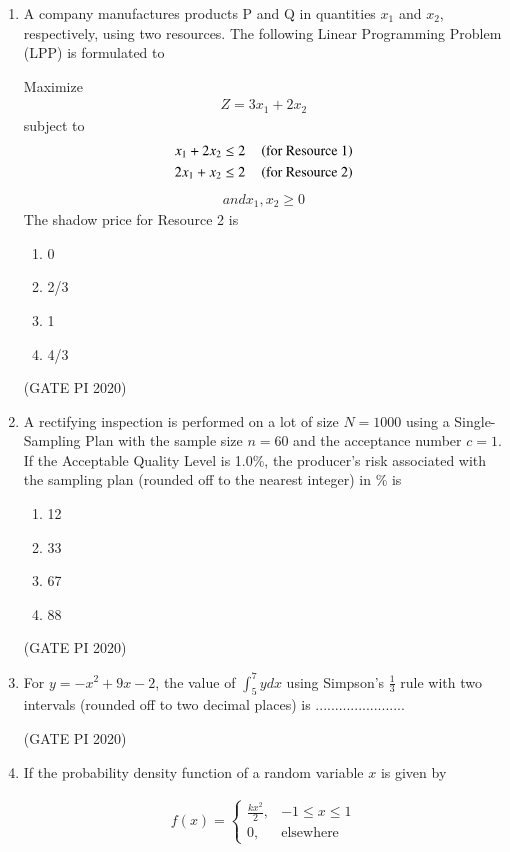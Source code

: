 \documentclass[journal,12pt,onecolumn]{IEEEtran}
\theoremstyle{remark}
\begin{document}
\begin{enumerate}
\item A company manufactures products P and Q in quantities $x_1$ and $x_2$, respectively, using two resources. The following Linear Programming Problem (LPP) is formulated to


Maximize 
\begin{align*}
Z = 3x_1 + 2x_2
\end{align*}
subject to 
\begin{align*}
x_1 + 2x_2 \leq 2 \quad \left(\text{for Resource 1}\right) \\
2x_1 + x_2 \leq 2 \quad \left(\text{for Resource 2}\right)
\end{align*}
\begin{align*}
and x_1, x_2 \geq 0
\end{align*}
The shadow price for Resource 2 is
\begin{enumerate}
    \item 0
    \item 2/3
    \item 1
    \item 4/3
\end{enumerate}

\hfill (GATE PI 2020)

\item A rectifying inspection is performed on a lot of size $N = 1000$ using a Single-Sampling Plan with the sample size $n = 60$ and the acceptance number $c = 1$. If the Acceptable Quality Level is 1.0\%, the producer's risk associated with the sampling plan (rounded off to the nearest integer) in \% is
\begin{enumerate}
    \item 12
    \item 33
    \item 67
    \item 88
\end{enumerate}

\hfill (GATE PI 2020)

\item For $y = -x^2 + 9x - 2$, the value of $\int_5^7 ydx$ using Simpson's $\frac{1}{3}$ rule with two intervals (rounded off to two decimal places) is .......................

\hfill (GATE PI 2020)

\item If the probability density function of a random variable $x$ is given by

\begin{align*}
f(x) =
\begin{cases}
\frac{kx^2}{2}, & -1 \leq x \leq 1 \\
0, & \text{elsewhere}
\end{cases}
\end{align*}


\end{enumerate}
\end{document}
